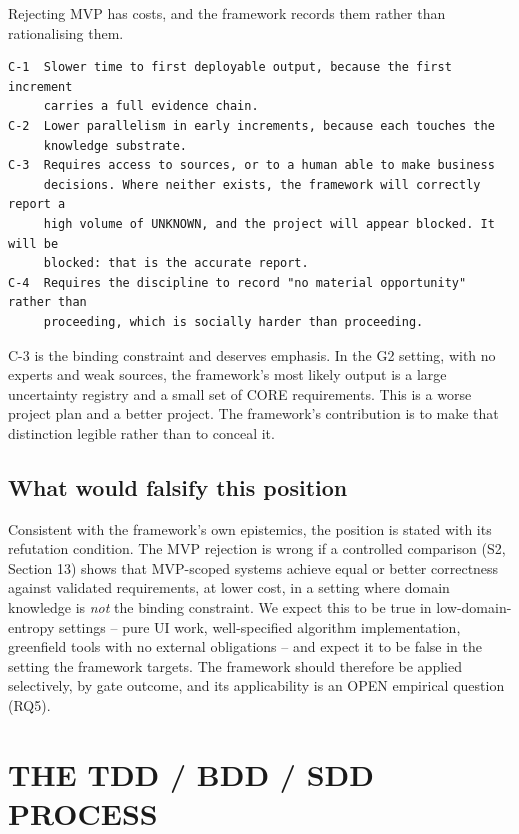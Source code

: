 \documentclass[11pt,a4paper]{article}
\begin{document}
Rejecting MVP has costs, and the framework records them rather than rationalising them.

\begin{Verbatim}[fontsize=\footnotesize,breaklines=true,breakanywhere=true,breakautoindent=false,samepage=false]
C-1  Slower time to first deployable output, because the first increment
     carries a full evidence chain.
C-2  Lower parallelism in early increments, because each touches the
     knowledge substrate.
C-3  Requires access to sources, or to a human able to make business
     decisions. Where neither exists, the framework will correctly report a
     high volume of UNKNOWN, and the project will appear blocked. It will be
     blocked: that is the accurate report.
C-4  Requires the discipline to record "no material opportunity" rather than
     proceeding, which is socially harder than proceeding.
\end{Verbatim}

C-3 is the binding constraint and deserves emphasis. In the G2 setting, with no experts and weak sources, the framework's most likely output is a large uncertainty registry and a small set of CORE requirements. This is a worse project plan and a better project. The framework's contribution is to make that distinction legible rather than to conceal it.

\subsection{What would falsify this position}

Consistent with the framework's own epistemics, the position is stated with its refutation condition. The MVP rejection is wrong if a controlled comparison (S2, Section 13) shows that MVP-scoped systems achieve equal or better correctness against validated requirements, at lower cost, in a setting where domain knowledge is \emph{not} the binding constraint. We expect this to be true in low-domain-entropy settings -- pure UI work, well-specified algorithm implementation, greenfield tools with no external obligations -- and expect it to be false in the setting the framework targets. The framework should therefore be applied selectively, by gate outcome, and its applicability is an OPEN empirical question (RQ5).

\section{THE TDD / BDD / SDD PROCESS}
\end{document}
